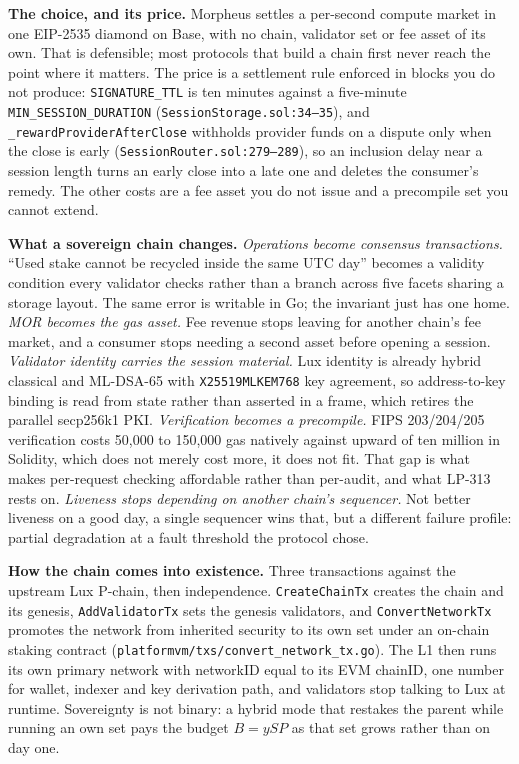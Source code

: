 \documentclass[10pt,a4paper]{article}
\newcommand{\code}[1]{\texttt{\small #1}}
\begin{document}

\noindent\textbf{The choice, and its price.}
Morpheus settles a per-second compute market in one EIP-2535 diamond on Base, with no chain,
validator set or fee asset of its own. That is defensible; most protocols that build a chain first
never reach the point where it matters. The price is a settlement rule enforced in blocks you do not
produce: \code{SIGNATURE\_TTL} is ten minutes against a five-minute
\code{MIN\_SESSION\_DURATION} (\code{SessionStorage.sol:34--35}), and
\code{\_rewardProviderAfterClose} withholds provider funds on a dispute only when the close is
early (\code{SessionRouter.sol:279--289}), so an inclusion delay near a session length turns an
early close into a late one and deletes the consumer's remedy. The other costs are a fee asset you
do not issue and a precompile set you cannot extend.

\vspace{0.35ex}
\noindent\textbf{What a sovereign chain changes.}
\emph{Operations become consensus transactions.} ``Used stake cannot be recycled inside the same
UTC day'' becomes a validity condition every validator checks rather than a branch across five
facets sharing a storage layout. The same error is writable in Go; the invariant just has one home.
\emph{MOR becomes the gas asset.} Fee revenue stops leaving for another chain's fee market, and a
consumer stops needing a second asset before opening a session.
\emph{Validator identity carries the session material.} Lux identity is already hybrid classical and
ML-DSA-65 with \code{X25519MLKEM768} key agreement, so address-to-key binding is read from state
rather than asserted in a frame, which retires the parallel secp256k1 PKI.
\emph{Verification becomes a precompile.} FIPS 203/204/205 verification costs 50{,}000 to 150{,}000
gas natively against upward of ten million in Solidity, which does not merely cost more, it does not
fit. That gap is what makes per-request checking affordable rather than per-audit, and what LP-313
rests on. \emph{Liveness stops depending on another chain's sequencer.} Not better liveness on a
good day, a single sequencer wins that, but a different failure profile: partial degradation at a
fault threshold the protocol chose.

\vspace{0.35ex}
\noindent\textbf{How the chain comes into existence.}
Three transactions against the upstream Lux P-chain, then independence. \code{CreateChainTx}
creates the chain and its genesis, \code{AddValidatorTx} sets the genesis validators, and
\code{ConvertNetworkTx} promotes the network from inherited security to its own set under an
on-chain staking contract (\code{platformvm/txs/convert\_network\_tx.go}). The L1 then runs its
own primary network with networkID equal to its EVM chainID, one number for wallet, indexer and key
derivation path, and validators stop talking to Lux at runtime. Sovereignty is not binary: a hybrid
mode that restakes the parent while running an own set pays the budget $B = ySP$ as that set grows
rather than on day one.
\end{document}
